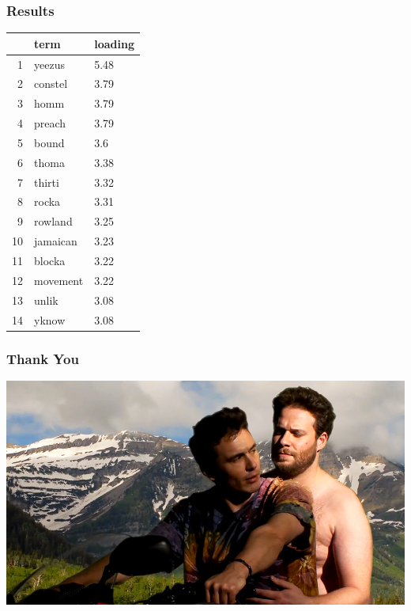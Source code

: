 \documentclass{beamer}
\begin{document}
\begin{frame}
\frametitle{Results}
\pause
\begin{table}[ht]
\centering
\begin{tabular}{rll}
  \hline
 & term & loading \\ 
  \hline
1 & yeezus & 5.48 \\ 
  2 & constel & 3.79 \\ 
  3 & homm & 3.79 \\ 
  4 & preach & 3.79 \\ 
  5 & bound & 3.6 \\ 
  6 & thoma & 3.38 \\ 
  7 & thirti & 3.32 \\ 
  8 & rocka & 3.31 \\ 
  9 & rowland & 3.25 \\ 
  10 & jamaican & 3.23 \\ 
  11 & blocka & 3.22 \\ 
  12 & movement & 3.22 \\ 
  13 & unlik & 3.08 \\ 
  14 & yknow & 3.08 \\ 
   \hline
\end{tabular}
\end{table}
\end{frame}



\begin{frame}
\frametitle{Thank You}
\pause
\begin{center}
\includegraphics[height=1.0\textheight]{Images/rogen.jpg}
\end{center}
\end{frame}
\end{document}
